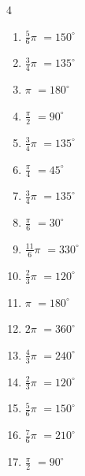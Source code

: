 \begin{multicols}{4}
\begin{enumerate}
  \item $\displaystyle \frac{5}{6}\pi$
        $\displaystyle =150^{\circ}$

  \item $\displaystyle \frac{3}{4}\pi$
        $\displaystyle =135^{\circ}$

  \item $\displaystyle \pi$
        $\displaystyle =180^{\circ}$

  \item $\displaystyle \frac{\pi}{2}$
        $\displaystyle =90^{\circ}$

  \item $\displaystyle \frac{3}{4}\pi$
        $\displaystyle =135^{\circ}$

  \item $\displaystyle \frac{\pi}{4}$
        $\displaystyle =45^{\circ}$

  \item $\displaystyle \frac{3}{4}\pi$
        $\displaystyle =135^{\circ}$

  \item $\displaystyle \frac{\pi}{6}$
        $\displaystyle =30^{\circ}$

  \item $\displaystyle \frac{11}{6}\pi$
        $\displaystyle =330^{\circ}$

  \item $\displaystyle \frac{2}{3}\pi$
        $\displaystyle =120^{\circ}$

  \item $\displaystyle \pi$
        $\displaystyle =180^{\circ}$

  \item $\displaystyle 2\pi$
        $\displaystyle =360^{\circ}$

  \item $\displaystyle \frac{4}{3}\pi$
        $\displaystyle =240^{\circ}$

  \item $\displaystyle \frac{2}{3}\pi$
        $\displaystyle =120^{\circ}$

\columnbreak %

  \item $\displaystyle \frac{5}{6}\pi$
        $\displaystyle =150^{\circ}$

  \item $\displaystyle \frac{7}{6}\pi$
        $\displaystyle =210^{\circ}$

  \item $\displaystyle \frac{\pi}{2}$
        $\displaystyle =90^{\circ}$


\end{enumerate}
\end{multicols}

